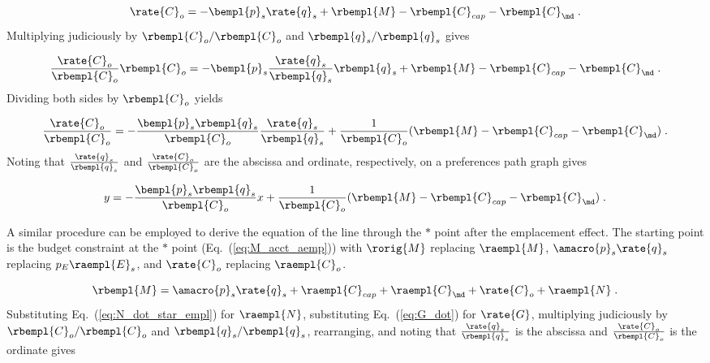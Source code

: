 \begin{equation}
  \rate{C}_o = - \bempl{p}_s \rate{q}_s + \rbempl{M} - \rbempl{C}_{cap} - \rbempl{C}_{\md} \; .
\end{equation}
%
Multiplying judiciously by $\rbempl{C}_o/\rbempl{C}_o$ and $\rbempl{q}_s/\rbempl{q}_s$ gives

\begin{equation}
  \frac{\rate{C}_o}{\rbempl{C}_o} \rbempl{C}_o
       = - \bempl{p}_s \frac{\rate{q}_s}{\rbempl{q}_s} \rbempl{q}_s 
         + \rbempl{M} - \rbempl{C}_{cap} - \rbempl{C}_{\md} \; .
\end{equation}
%
Dividing both sides by $\rbempl{C}_o$ yields

\begin{equation}
  \frac{\rate{C}_o}{\rbempl{C}_o}
       = - \frac{\bempl{p}_s \rbempl{q}_s}{\rbempl{C}_o} \frac{\rate{q}_s}{\rbempl{q}_s}
         + \frac{1}{\rbempl{C}_o} (\rbempl{M} - \rbempl{C}_{cap} - \rbempl{C}_{\md}) \; .
\end{equation}
%
Noting that  
$\frac{\rate{q}_s}{\rbempl{q}_s}$ and 
$\frac{\rate{C}_o}{\rbempl{C}_o}$ are
the abscissa and ordinate, respectively,
on a preferences path graph gives

\begin{equation} \label{eq:orig_line_prefs}
  y = - \frac{\bempl{p}_s \rbempl{q}_s}{\rbempl{C}_o} x
         + \frac{1}{\rbempl{C}_o} (\rbempl{M} - \rbempl{C}_{cap} - \rbempl{C}_{\md}) \; .
\end{equation}

A similar procedure can be employed to derive the equation of the
\starstar{} line through the $*$ point
after the emplacement effect.
The starting point is the budget constraint at the $*$ point
(Eq.~(\ref{eq:M_acct_aemp}))
with $\rorig{M}$ replacing $\raempl{M}$, 
$\amacro{p}_s \rate{q}_s$ replacing $p_E \raempl{E}_s$, and
$\rate{C}_o$ replacing $\raempl{C}_o$.

\begin{equation}
  \rbempl{M} = \amacro{p}_s \rate{q}_s + \raempl{C}_{cap} + \raempl{C}_{\md} + \rate{C}_o + \raempl{N} \; .
\end{equation}
%
Substituting Eq.~(\ref{eq:N_dot_star_empl}) for $\raempl{N}$,
substituting Eq.~(\ref{eq:G_dot}) for $\rate{G}$,
multiplying judiciously by $\rbempl{C}_o/\rbempl{C}_o$ and $\rbempl{q}_s/\rbempl{q}_s$, 
rearranging, and noting that 
$\frac{\rate{q}_s}{\rbempl{q}_s}$ is the abscissa and 
$\frac{\rate{C}_o}{\rbempl{C}_o}$ is the ordinate gives


